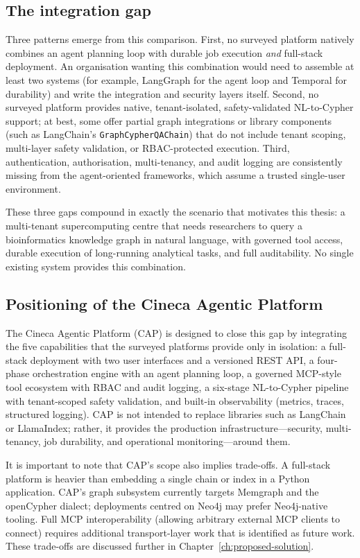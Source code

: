 \documentclass[a4paper]{sapthesis}
\begin{document}
\subsection{The integration gap}

Three patterns emerge from this comparison.  First, no surveyed platform
natively combines an agent planning loop with durable job execution
\emph{and} full-stack deployment.  An organisation wanting this combination
would need to assemble at least two systems (for example, LangGraph for the
agent loop and Temporal for durability) and write the integration and
security layers itself.  Second, no surveyed platform provides native,
tenant-isolated, safety-validated NL-to-Cypher support; at best, some offer
partial graph integrations or library components (such as LangChain's
\texttt{GraphCypherQAChain}) that do not include tenant scoping, multi-layer
safety validation, or RBAC-protected execution.  Third, authentication,
authorisation, multi-tenancy, and audit logging are consistently missing
from the agent-oriented frameworks, which assume a trusted single-user
environment.

These three gaps compound in exactly the scenario that motivates this thesis:
a multi-tenant supercomputing centre that needs researchers to query a
bioinformatics knowledge graph in natural language, with governed tool
access, durable execution of long-running analytical tasks, and full
auditability.  No single existing system provides this combination.

\subsection{Positioning of the Cineca Agentic Platform}

The Cineca Agentic Platform (CAP) is designed to close this gap by
integrating the five capabilities that the surveyed platforms provide only
in isolation: a full-stack deployment with two user interfaces and a
versioned REST API, a four-phase orchestration engine with an agent
planning loop, a governed MCP-style tool ecosystem with RBAC and audit
logging, a six-stage NL-to-Cypher pipeline with tenant-scoped safety
validation, and built-in observability (metrics, traces, structured
logging).  CAP is not intended to replace libraries such as LangChain or
LlamaIndex; rather, it provides the production infrastructure---security,
multi-tenancy, job durability, and operational monitoring---around them.

It is important to note that CAP's scope also implies trade-offs.  A
full-stack platform is heavier than embedding a single chain or index in a
Python application.  CAP's graph subsystem currently targets Memgraph and
the openCypher dialect; deployments centred on Neo4j may prefer Neo4j-native
tooling.  Full MCP interoperability (allowing arbitrary external MCP clients
to connect) requires additional transport-layer work that is identified as
future work.  These trade-offs are discussed further in
Chapter~\ref{ch:proposed-solution}.
\end{document}
